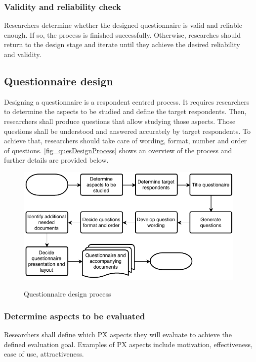 \subsubsection{Validity and reliability check}
Researchers determine whether the designed questionnaire is valid and reliable enough. If so, the process is finished successfully. Otherwise, researches should return to the design stage and iterate until they achieve the desired reliability and validity.

\subsection{Questionnaire design}
\label{sec:ques_design}
Designing a questionnaire is a respondent centred process. It requires researchers to determine the aspects to be studied and define the target respondents. Then, researchers shall produce questions that allow studying those aspects. Those questions shall be understood and answered accurately by target respondents. To achieve that, researchers should take care of wording, format, number and order of questions. \autoref{fig_quesDesignProcess} shows an overview of the process and further details are provided below.

\begin{figure}[htb]
\myfloatalign
{\includegraphics[width=0.9\linewidth]{gfx/standard/quesDesignProcess}} \quad
\caption[Questionnaire design process]{Questionnaire design process}\label{fig_quesDesignProcess}
\end{figure}

\subsubsection{Determine aspects to be evaluated} 
Researchers shall define which \ac{PX} aspects they will evaluate to achieve the defined evaluation goal. Examples of \ac{PX} aspects include motivation, effectiveness, ease of use, attractiveness.

